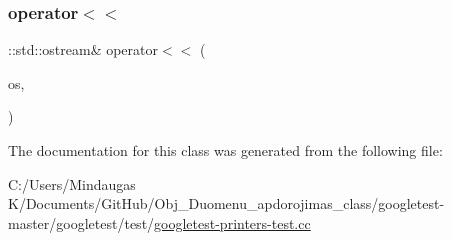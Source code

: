 \mbox{\label{classfoo_1_1_path_like_ab5544a5497a8a470802bd8fcf97c49da}} 
\subsubsection{\texorpdfstring{operator$<$$<$}{operator<<}\hspace{0.1cm}{\footnotesize\ttfamily [3/3]}}
{\footnotesize\ttfamily \+::std\+::ostream\& operator$<$$<$ (\begin{DoxyParamCaption}\item[{\+::std\+::ostream \&}]{os,  }\item[{const \mbox{\hyperlink{classfoo_1_1_path_like}{Path\+Like}} \&}]{ }\end{DoxyParamCaption})\hspace{0.3cm}{\ttfamily [friend]}}



The documentation for this class was generated from the following file\+:\begin{DoxyCompactItemize}
\item 
C\+:/\+Users/\+Mindaugas K/\+Documents/\+Git\+Hub/\+Obj\+\_\+\+Duomenu\+\_\+apdorojimas\+\_\+class/googletest-\/master/googletest/test/\mbox{\hyperlink{googletest-master_2googletest_2test_2googletest-printers-test_8cc}{googletest-\/printers-\/test.\+cc}}\end{DoxyCompactItemize}
